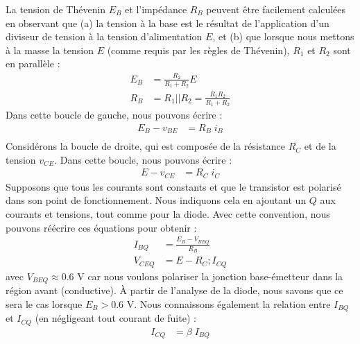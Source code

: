 La tension de Thévenin $E_B$ et l'impédance $R_B$ peuvent être facilement calculées en observant que (a) la tension à la base est le résultat de l'application d'un diviseur de tension à la tension d'alimentation $E$, et (b) que lorsque nous mettons à la masse la tension $E$ (comme requis par les règles de Thévenin), $R_1$ et $R_2$ sont en parallèle :
\begin{equation}
	\begin{split}
		E_B &= \frac{R_2}{R_1 + R_2} E \\
		R_B &= R_1 || R_2 = \frac{R_1 R_2}{R_1 + R_2}
	\end{split}
\end{equation}
Dans cette boucle de gauche, nous pouvons écrire :
\begin{equation}
	\begin{split}
		E_B - v_{BE} &= R_B \; i_B \\
	\end{split}
\end{equation}
Considérons la boucle de droite, qui est composée de la résistance $R_C$ et de la tension $v_{CE}$. Dans cette boucle, nous pouvons écrire :
\begin{equation}
	\begin{split}
		E - v_{CE} &= R_C \; i_C
	\end{split}
\end{equation}
Supposons que tous les courants sont constants et que le transistor est polarisé dans son point de fonctionnement. Nous indiquons cela en ajoutant un $Q$ aux courants et tensions, tout comme pour la diode. Avec cette convention, nous pouvons réécrire ces équations pour obtenir :
\begin{equation}
	\begin{split}
		I_{BQ} &= \frac{E_B - V_{BEQ}}{R_B}\\
		V_{CEQ} &= E - R_C ; I_{CQ}
	\end{split}
\end{equation}
avec $V_{BEQ} \approx 0.6$ V car nous voulons polariser la jonction base-émetteur dans la région avant (conductive). À partir de l'analyse de la diode, nous savons que ce sera le cas lorsque $E_B > 0.6$ V. Nous connaissons également la relation entre $I_{BQ}$ et $I_{CQ}$ (en négligeant tout courant de fuite) :
\begin{equation}
	\begin{split}
		I_{CQ} &= \beta \; I_{BQ}
	\end{split}
\end{equation}
